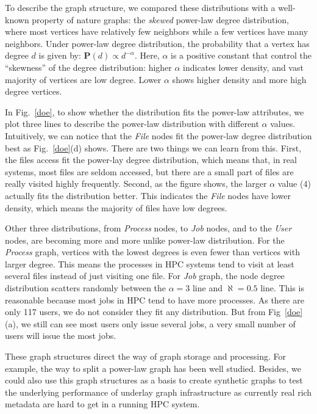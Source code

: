 To describe the graph structure, we compared these distributions with a well-known property of nature graphs: the \textit{skewed} power-law degree distribution, where most vertices have relatively few neighbors while a few vertices have many neighbors. Under power-law degree distribution, the probability that a vertex has degree $d$ is given by: $\textbf{P}(d) \propto d^{-\alpha}$. Here, $\alpha$ is a positive constant that control the ``skewness'' of the degree distribution: higher $\alpha$ indicates lower density, and vast majority of vertices are low degree. Lower $\alpha$ shows higher density and more high degree vertices. 

In Fig.~\ref{doe}, to show whether the distribution fits the power-law attributes, we plot three lines to describe the power-law distribution with different $\alpha$ values. Intuitively, we can notice that the \textit{File} nodes fit the power-law degree distribution best as Fig.~\ref{doe}(d) shows. There are two things we can learn from this. First, the files access fit the power-lay degree distribution, which means that, in real systems, most files are seldom accessed, but there are a small part of files are really visited highly frequently. Second, as the figure shows, the larger $\alpha$ value ($4$) actually fits the distribution better. This indicates the \textit{File} nodes have lower density, which means the majority of files have low degrees. 

Other three distributions, from \textit{Process} nodes, to \textit{Job} nodes, and to the \textit{User} nodes, are becoming more and more unlike power-law distribution. For the \textit{Process} graph, vertices with the lowest degrees is even fewer than vertices with larger degree. This means the processes in HPC systems tend to visit at least several files instead of just visiting one file. For \textit{Job} graph, the node degree distribution scatters randomly between the $\alpha=3$ line and $\aleph=0.5$ line. This is reasonable because most jobs in HPC tend to have more processes. As there are only 117 users, we do not consider they fit any distribution. But from Fig~\ref{doe}(a), we still can see most users only issue several jobs, a very small number of users will issue the most jobs.

These graph structures direct the way of graph storage and processing. For example, the way to split a power-law graph has been well studied. Besides, we could also use this graph structures as a basis to create synthetic graphs to test the underlying performance of underlay graph infrastructure as currently real rich metadata are hard to get in a running HPC system.

